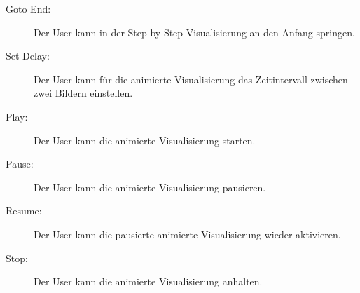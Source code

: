 \begin{description}
  \item[Goto End:] Der User kann in der Step-by-Step-Visualisierung an den Anfang springen.

  \item[Set Delay:] Der User kann f\"ur die animierte Visualisierung das Zeitintervall zwischen zwei Bildern einstellen.

  \item[Play:] Der User kann die animierte Visualisierung starten.

  \item[Pause:] Der User kann die animierte Visualisierung pausieren.

  \item[Resume:] Der User kann die pausierte animierte Visualisierung wieder aktivieren.

  \item[Stop:] Der User kann die animierte Visualisierung anhalten.
\end{description}
% 
